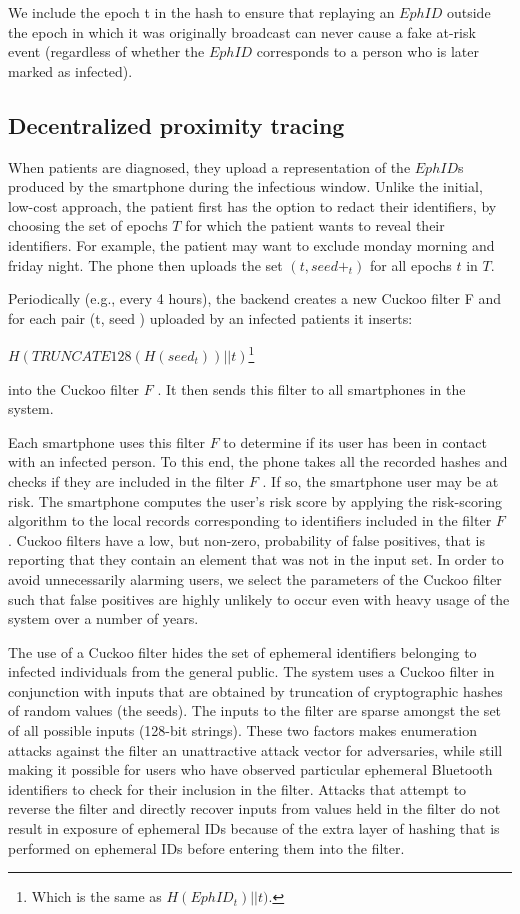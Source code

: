 \documentclass[10.8pt,a4paper]{article}
\begin{document}
We include the epoch  t in the hash to ensure that replaying an $EphID$ outside the epoch in which it was originally broadcast can never cause a fake at-risk event (regardless of whether the $EphID$ corresponds to a person who is later marked as infected).

\subsection{Decentralized proximity tracing}

When patients are diagnosed, they upload a representation of the $EphID$s produced by the smartphone during the infectious window. Unlike the initial, low-cost approach, the patient first has the option to  redact their identifiers, by choosing the set of epochs  $T$ for which the patient wants to reveal their identifiers. For example, the patient may want to exclude monday morning and friday night. The phone then uploads the set  ${(t, seed+_t)  }$ for all epochs  $t $ in  $T$.

Periodically (e.g., every 4 hours), the backend creates a new Cuckoo filter  F and for each
pair  (t, seed  )  uploaded by an infected patients it inserts:

$H( TRUNCATE128( H( seed_t ) ) || t )$\footnote{Which is the same as $H(EphID_t) || t)$.}


into the Cuckoo filter  $F$ . It then sends this filter to all smartphones in the system.

Each smartphone uses this filter  $F$ to determine if its user has been in contact with an infected person. To this end, the phone takes all the recorded hashes and checks if they are included in the filter  $F$ . If so, the smartphone user may be at risk. The smartphone computes the user’s risk score by applying the risk-scoring algorithm to the local records corresponding to identifiers included in the filter  $F$ . Cuckoo filters have a low, but non-zero, probability of false positives, that is reporting that they contain an element that was not in the input set. In order to avoid unnecessarily alarming users, we select the parameters of the Cuckoo filter such that false positives are highly unlikely to occur even with heavy usage of the system over a number of years.

The use of a Cuckoo filter hides the set of ephemeral identifiers belonging to infected individuals from the general public. The system uses a Cuckoo filter in conjunction with inputs that are obtained by truncation of cryptographic hashes of random values (the seeds). The inputs to the filter are sparse amongst the set of all possible inputs (128-bit strings). These two factors makes enumeration attacks against the filter an unattractive attack vector for adversaries, while still making it possible for users who have observed particular ephemeral Bluetooth identifiers to check for their inclusion in the filter. Attacks that attempt to reverse the filter and directly recover inputs from values held in the filter do not result in exposure of ephemeral IDs because of the extra layer of hashing that is performed on ephemeral IDs before entering them into the filter.
\end{document}
